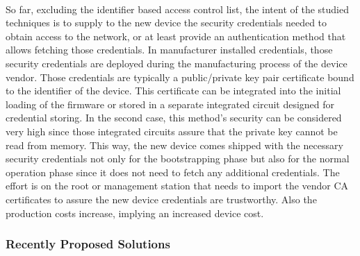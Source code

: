\paragraph{}
So far, excluding the identifier based access control list, the intent of the studied techniques is to supply to the new device the security credentials needed to obtain access to the network, or at least provide an authentication method that allows fetching those credentials. In manufacturer installed credentials, those security credentials are deployed during the manufacturing process of the device vendor. Those credentials are typically a public/private key pair certificate bound to the identifier of the device. This certificate can be integrated into the initial loading of the firmware or stored in a separate integrated circuit designed for credential storing. In the second case, this method's security can be considered very high since those integrated circuits assure that the private key cannot be read from memory. This way, the new device comes shipped with the necessary security credentials not only for the bootstrapping phase but also for the normal operation phase since it does not need to fetch any additional credentials. The effort is on the root or management station that needs to import the vendor \ac{CA} certificates to assure the new device credentials are trustworthy. Also the production costs increase, implying an increased device cost.

\subsubsection{Recently Proposed Solutions}
